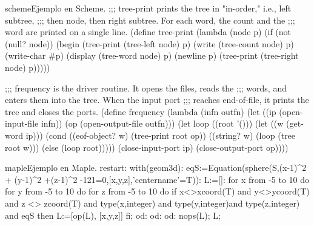 \begin{sourcecode}{scheme}{Ejemplo en Scheme.}
;;; tree-print prints the tree in "in-order," i.e., left subtree,
;;; then node, then right subtree.  For each word, the count and the
;;; word are printed on a single line.
(define tree-print
	(lambda (node p)
	(if (not (null? node))
		(begin
			(tree-print (tree-left node) p)
			(write (tree-count node) p)
			(write-char #\space p)
			(display (tree-word node) p)
			(newline p)
			(tree-print (tree-right node) p)))))

;;; frequency is the driver routine.  It opens the files, reads the
;;; words, and enters them into the tree.  When the input port
;;; reaches end-of-file, it prints the tree and closes the ports.
(define frequency
	(lambda (infn outfn)
	(let ((ip (open-input-file infn))
			(op (open-output-file outfn)))
		(let loop ((root '()))
		(let ((w (get-word ip)))
			(cond
				((eof-object? w) (tree-print root op))
				((string? w) (loop (tree root w)))
				(else (loop root)))))
		(close-input-port ip)
		(close-output-port op))))
\end{sourcecode}

\begin{sourcecode}{maple}{Ejemplo en Maple.}
restart:
with(geom3d):
eqS:=Equation(sphere(S,(x-1)^2 + (y-1)^2 +(z-1)^2 -121=0,[x,y,z],'centername'=T)):
L:=[]:
for x from -5 to 10  do
for y from -5 to 10  do
for z from -5 to 10  do  if  x<>xcoord(T) and y<>ycoord(T) and z <> zcoord(T) and   type(x,integer) and type(y,integer)and type(z,integer) and eqS then
L:=[op(L), [x,y,z]] fi;
od: od: od: 
nops(L);  
L;
\end{sourcecode}

